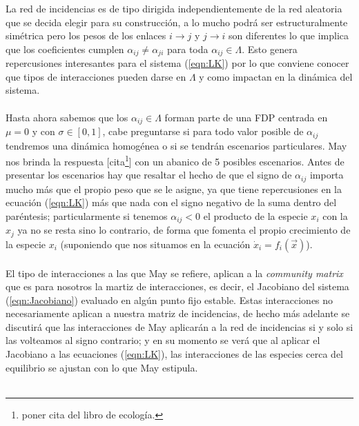 La red de incidencias es de tipo dirigida independientemente de la red aleatoria que se decida elegir para su construcción, a lo mucho podrá ser estructuralmente simétrica pero los pesos de los enlaces $i\to j$ y $j\to i$ son diferentes lo que implica que los coeficientes cumplen $\alpha_{ij}\neq\alpha_{ji}$ para toda $\alpha_{ij}\in\Lambda$. Esto genera repercusiones interesantes para el sistema (\ref{eqn:LK}) por lo que conviene conocer que tipos de interacciones pueden darse en $\Lambda$ y como impactan en la dinámica del sistema.\\
\\
Hasta ahora sabemos que los $\alpha_{ij}\in\Lambda$ forman parte de una FDP centrada en $\mu=0$ y con $\sigma\in[0,1]$, cabe preguntarse si para todo valor posible de $\alpha_{ij}$ tendremos una dinámica homogénea o si se tendrán escenarios particulares. May nos brinda la respuesta [cita\footnote{poner cita  del libro de ecología.}] con un abanico de 5 posibles escenarios. Antes de presentar los escenarios hay que resaltar el hecho de que el signo de $\alpha_{ij}$ importa mucho más que el propio peso que se le asigne, ya que tiene repercusiones en la ecuación (\ref{eqn:LK}) más que nada con el signo negativo de la suma dentro del paréntesis; particularmente si tenemos $\alpha_{ij}<0$ el producto de la especie $x_i$ con la $x_j$ ya no se resta sino lo contrario, de forma que fomenta el propio crecimiento de la especie $x_i$ (suponiendo que nos situamos en la ecuación $\dot{x}_i=f_i(\vec{x})$).\\
\\
El tipo de interacciones a las que May se refiere, aplican a la \textit{community matrix} que es para nosotros la martiz de interacciones, es decir, el Jacobiano del sistema (\ref{eqn:Jacobiano}) evaluado en algún punto fijo estable. Estas interacciones no necesariamente aplican a nuestra matriz de incidencias, de hecho más adelante se discutirá que las interacciones de May aplicarán a la red de incidencias si y solo si las volteamos al signo contrario; y en su momento se verá que al aplicar el Jacobiano a las ecuaciones (\ref{eqn:LK}), las interacciones de las especies cerca del equilibrio se ajustan con lo que May estipula.\\
\\
